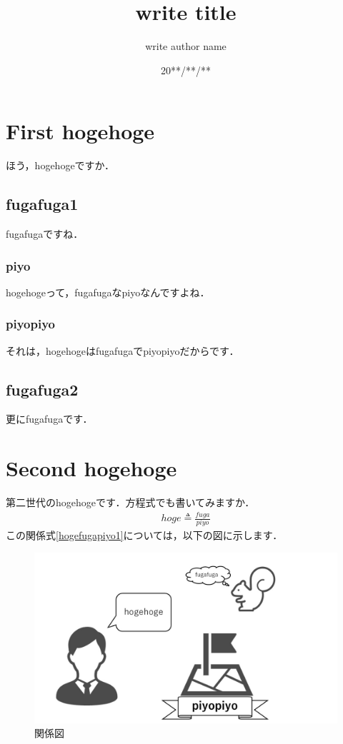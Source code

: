\documentclass[11pt, a4paper, titlepage]{jsarticle} %
\title{write title}
\author{write author name}
\date{20**/**/**}
\begin{document}
\maketitle
\section{First hogehoge}
ほう，hogehogeですか．
\subsection{fugafuga1}
fugafugaですね．
\subsubsection{piyo}
hogehogeって，fugafugaなpiyoなんですよね．
\subsubsection{piyopiyo}
それは，hogehogeはfugafugaでpiyopiyoだからです．
\subsection{fugafuga2}
更にfugafugaです．
\section{Second hogehoge}
第二世代のhogehogeです．方程式でも書いてみますか．
\begin{align}
    \label{hogefugapiyo1}
    hoge \triangleq \frac{fuga}{piyo}
\end{align}
この関係式\ref{hogefugapiyo1}については，以下の図に示します．

\begin{figure}[htb]
    \centerline{\includegraphics[scale=0.3, clip]{hogefugapiyo.jpg}}
    \caption{関係図}
    \label{hogefugapiyo2}
\end{figure}
\end{document}
